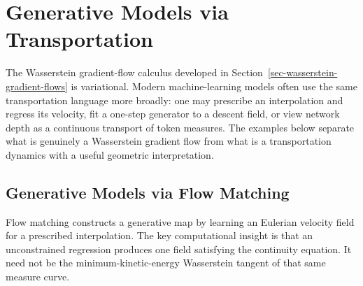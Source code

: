
\section{Generative Models via Transportation}
\label{sec-generative-models-transportation}

The Wasserstein gradient-flow calculus developed in Section~\ref{sec-wasserstein-gradient-flows} is variational. Modern machine-learning models often use the same transportation language more broadly: one may prescribe an interpolation and regress its velocity, fit a one-step generator to a descent field, or view network depth as a continuous transport of token measures. The examples below separate what is genuinely a Wasserstein gradient flow from what is a transportation dynamics with a useful geometric interpretation.

\subsection{Generative Models via Flow Matching}
\label{sec-generative-flow-matching}

Flow matching constructs a generative map by learning an Eulerian velocity field for a prescribed interpolation. The key computational insight is that an unconstrained regression produces one field satisfying the continuity equation. It need not be the minimum-kinetic-energy Wasserstein tangent of that same measure curve.

